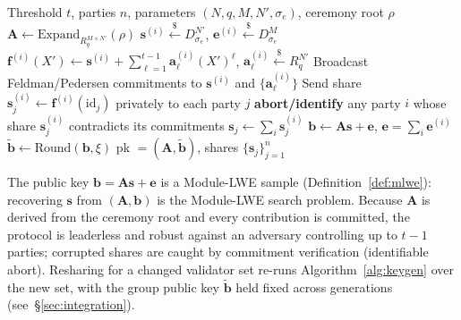 \begin{algorithm}[H]
\caption{Corona Distributed Key Generation}
\label{alg:keygen}
\begin{algorithmic}[1]
\Require Threshold $t$, parties $n$, parameters $(N, q, M, N', \sigma_e)$, ceremony root $\rho$
\State $\mathbf{A} \gets \mathrm{Expand}_{R_q^{M \times N'}}(\rho)$ 
 
    \State $\mathbf{s}^{(i)} \stackrel{\$}{\leftarrow} D_{\sigma_e}^{N'}$, \quad $\mathbf{e}^{(i)} \stackrel{\$}{\leftarrow} D_{\sigma_e}^{M}$ 
    \State $\mathbf{f}^{(i)}(X') \gets \mathbf{s}^{(i)} + \sum_{\ell=1}^{t-1} \mathbf{a}^{(i)}_\ell (X')^\ell$, \quad $\mathbf{a}^{(i)}_\ell \stackrel{\$}{\leftarrow} R_q^{N'}$ 
    \State Broadcast Feldman/Pedersen commitments to $\mathbf{s}^{(i)}$ and $\{\mathbf{a}^{(i)}_\ell\}$
    \State Send share $\mathbf{s}^{(i)}_j \gets \mathbf{f}^{(i)}(\mathrm{id}_j)$ privately to each party $j$
\EndFor
{} 
    \State \textbf{abort/identify} any party $i$ whose share $\mathbf{s}^{(i)}_j$ contradicts its commitments
    \State $\mathbf{s}_j \gets \sum_{i} \mathbf{s}^{(i)}_j$ 
\EndFor
\State $\mathbf{b} \gets \mathbf{A}\mathbf{s} + \mathbf{e}$, \quad $\mathbf{e} = \sum_i \mathbf{e}^{(i)}$ 
\State $\tilde{\mathbf{b}} \gets \mathrm{Round}(\mathbf{b}, \xi)$ 
\State \Return pk $= (\mathbf{A}, \tilde{\mathbf{b}})$, \; shares $\{\mathbf{s}_j\}_{j=1}^{n}$ 
\end{algorithmic}
\end{algorithm}

\noindent The public key $\mathbf{b} = \mathbf{A}\mathbf{s} + \mathbf{e}$ is a Module-LWE
sample (Definition~\ref{def:mlwe}): recovering $\mathbf{s}$ from $(\mathbf{A}, \mathbf{b})$
is the Module-LWE search problem. Because $\mathbf{A}$ is derived from the ceremony root
and every contribution is committed, the protocol is leaderless and robust against an
adversary controlling up to $t-1$ parties; corrupted shares are caught by commitment
verification (identifiable abort). Resharing for a changed validator set re-runs
Algorithm~\ref{alg:keygen} over the new set, with the group public key
$\tilde{\mathbf{b}}$ held fixed across generations (see~\S\ref{sec:integration}).

